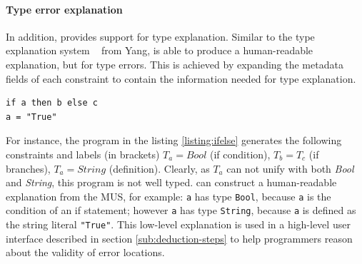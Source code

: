 \paragraph{Type error explanation}

In addition, \chameleon{} provides support for type explanation. Similar to the type explanation system ~\cite{jun2002explaining} from Yang,  \chameleon{} is able to produce a human-readable explanation, but for type errors. This is achieved by expanding the metadata fields of each constraint to contain the information needed for type explanation. 


\begin{verbatim}
if a then b else c
a = "True"
\end{verbatim}

For instance, the program in the listing \ref{listing:ifelse} \chameleon{}  generates the following constraints and labels (in brackets) $T_a = Bool$ (if condition), $T_b = T_c$ (if branches), $T_a= String$  (definition). Clearly, as $T_a$ can not unify with both \textit{Bool} and \textit{String}, this program is not well typed. \chameleon{} can construct a human-readable explanation from the MUS, for example: \texttt{a} has type \texttt{Bool}, because \texttt{a} is the condition of an if statement; however \texttt{a} has type \texttt{String}, because \texttt{a} is defined as the string literal \texttt{"True"}. This low-level explanation is used in a high-level user interface described in section \ref{sub:deduction-steps} to help programmers reason about the validity of error locations.


